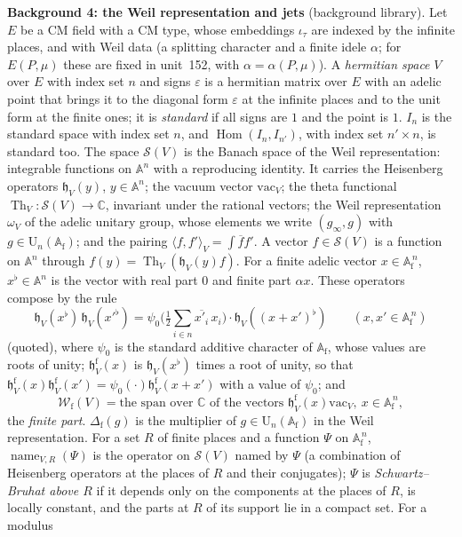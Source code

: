 \documentclass[11pt,a4paper]{article}
\newcommand{\subhead}[1]{\par\addvspace{9pt plus 2pt}\Needspace{4\baselineskip}\noindent\textbf{#1}\enspace\ignorespaces}
\theoremstyle{plainx}
\theoremstyle{uprightx}
\newcommand{\CC}{\mathbb{C}}
\newcommand{\cj}[1]{\overline{#1}}
\newcommand{\Af}{\mathbb{A}_{\mathrm{f}}}
\newcommand{\Ad}{\mathbb{A}}
\newcommand{\EP}[2]{E(#1,#2)}
\newcommand{\emb}[1]{\iota_{#1}}
\newcommand{\alP}[2]{\alpha(#1,#2)}
\newcommand{\Sw}[1]{\mathcal{S}(#1)}
\newcommand{\Wf}[1]{\mathcal{W}_{\mathrm{f}}(#1)}
\newcommand{\vac}[1]{\mathrm{vac}_{#1}}
\newcommand{\heis}[2]{\mathfrak{h}_{#1}(#2)}
\newcommand{\fheis}[2]{\mathfrak{h}^{\mathrm{f}}_{#1}(#2)}
\newcommand{\fv}[1]{#1^{\flat}}
\newcommand{\Th}[1]{\operatorname{Th}_{#1}}
\newcommand{\weil}[1]{\omega_{#1}}
\newcommand{\inn}[3]{\langle #2,#3\rangle_{#1}}
\newcommand{\name}[3]{\operatorname{name}_{#1,#2}(#3)}
\newcommand{\fmult}[1]{\Delta_{\mathrm{f}}(#1)}
\newcommand{\Uf}[1]{\mathrm{U}_{#1}(\Af)}
\newcommand{\stdsp}[1]{I_{#1}}
\newcommand{\homsp}[2]{\operatorname{Hom}(\stdsp{#1},\stdsp{#2})}
\begin{document}
\subhead{Background 4: the Weil representation and jets} (background library). Let $E$ be a CM field with a CM
type, whose embeddings $\emb{\tau}$ are indexed by the infinite places, and with Weil data (a splitting character
and a finite idele $\alpha$; for $\EP{P}{\mu}$ these are fixed in unit~152, with $\alpha=\alP{P}{\mu}$). A
\emph{hermitian space} $V$ over $E$ with index set $n$ and signs $\varepsilon$ is a hermitian matrix over $E$ with
an adelic point that brings it to the diagonal form $\varepsilon$ at the infinite places and to the unit form at
the finite ones; it is \emph{standard} if all signs are $1$ and the point is $1$. $\stdsp{n}$ is the standard space
with index set $n$, and $\homsp{n}{n'}$, with index set $n'\times n$, is standard too. The space $\Sw{V}$ is the
Banach space of the Weil representation: integrable functions on $\Ad^n$ with a reproducing identity. It carries
the Heisenberg operators $\heis{V}{y}$, $y\in\Ad^n$; the vacuum vector $\vac{V}$; the theta functional
$\Th{V}\colon\Sw{V}\to\CC$, invariant under the rational vectors; the Weil representation $\weil{V}$ of the adelic
unitary group, whose elements we write $(g_\infty,g)$ with $g\in\Uf{n}$; and the pairing
$\inn{V}{f}{f'}=\int\cj{f}f'$. A vector $f\in\Sw{V}$ is a function on $\Ad^n$ through
$f(y)=\Th{V}(\heis{V}{y}f)$. For a finite adelic vector $x\in\Af^{\,n}$, $\fv{x}\in\Ad^n$ is the vector with real
part $0$ and finite part $\alpha x$. These operators compose by the rule
\begin{equation}\label{e:heis}
\heis{V}{\fv{x}}\,\heis{V}{\fv{x'}}=\psi_0\bigl(\tfrac12\textstyle\sum_{i\in n}\cj{x'_i}\,x_i\bigr)\cdot\heis{V}{\fv{(x+x')}}
\qquad(x,x'\in\Af^{\,n})
\end{equation}
(quoted), where $\psi_0$ is the standard additive character of $\Af$, whose values are roots of unity;
$\fheis{V}{x}$ is $\heis{V}{\fv{x}}$ times a root of unity, so that
$\fheis{V}{x}\fheis{V}{x'}=\psi_0(\cdot)\fheis{V}{x+x'}$ with a value of $\psi_0$; and
\[\Wf{V}=\text{the span over }\CC\text{ of the vectors }\fheis{V}{x}\vac{V},\ x\in\Af^{\,n} ,\]
the \emph{finite part}. $\fmult{g}$ is the multiplier of $g\in\Uf{n}$ in the Weil representation. For a set $R$ of
finite places and a function $\Psi$ on $\Af^{\,n}$, $\name{V}{R}{\Psi}$ is the operator on $\Sw{V}$ named by $\Psi$
(a combination of Heisenberg operators at the places of $R$ and their conjugates); $\Psi$ is
\emph{Schwartz--Bruhat above $R$} if it depends only on the components at the places of $R$, is locally constant,
and the parts at $R$ of its support lie in a compact set. For a modulus
\end{document}
